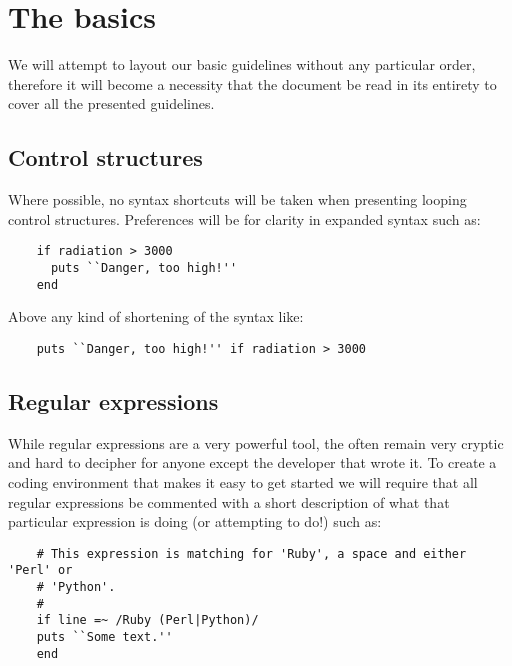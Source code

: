\section{The basics}  
We will attempt to layout our basic guidelines without any particular order,
therefore it will become a necessity that the document be read in its entirety
to cover all the presented guidelines.


\subsection{Control structures}
Where possible, no syntax shortcuts will be taken when presenting looping control
structures. Preferences will be for clarity in expanded syntax such as:

\begin{verbatim}
	if radiation > 3000
	  puts ``Danger, too high!''
	end
\end{verbatim}
	
Above any kind of shortening of the syntax like:

\begin{verbatim}
	puts ``Danger, too high!'' if radiation > 3000
\end{verbatim}


\subsection{Regular expressions}
While regular expressions are a very powerful tool, the often remain very
cryptic and hard to decipher for anyone except the developer that wrote it. To
create a coding environment that makes it easy to get started we will require
that all regular expressions be commented with a short description of what
that particular expression is doing (or attempting to do!) such as:

\begin{verbatim}
	# This expression is matching for 'Ruby', a space and either 'Perl' or
	# 'Python'.
	#
	if line =~ /Ruby (Perl|Python)/
    puts ``Some text.''
	end
\end{verbatim}
